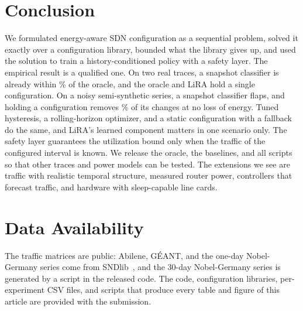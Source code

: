 \documentclass[journal]{IEEEtran}
\begin{document}
\section{Conclusion}\label{sec:conclusion}

We formulated energy-aware SDN configuration as a sequential problem, solved it exactly over a configuration library, bounded what the library gives up, and used the solution to train a history-conditioned policy with a safety layer. The empirical result is a qualified one. On two real traces, a snapshot classifier is already within \bfourAbiGap\% of the oracle, and the oracle and LiRA hold a single configuration. On a noisy semi-synthetic series, a snapshot classifier flaps, and holding a configuration removes \nobY\% of its changes at no loss of energy. Tuned hysteresis, a rolling-horizon optimizer, and a static configuration with a fallback do the same, and LiRA's learned component matters in one scenario only. The safety layer guarantees the utilization bound only when the traffic of the configured interval is known. We release the oracle, the baselines, and all scripts so that other traces and power models can be tested. The extensions we see are traffic with realistic temporal structure, measured router power, controllers that forecast traffic, and hardware with sleep-capable line cards.

\section*{Data Availability}
The traffic matrices are public: Abilene, G\'{E}ANT, and the one-day Nobel-Germany series come from SNDlib~\cite{orlowski2010sndlib,uhlig2006geant,zhang2003tomogravity}, and the 30-day Nobel-Germany series is generated by a script in the released code. The code, configuration libraries, per-experiment CSV files, and scripts that produce every table and figure of this article are provided with the submission.



\end{document}
